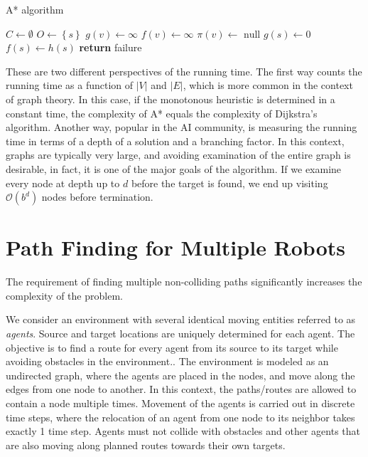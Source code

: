\begin{algorithm}
\DontPrintSemicolon
\SetAlgoLined
{}
\caption{A* algorithm}
\BlankLine
{}
\BlankLine
	$C\leftarrow\emptyset$ 
	$O\leftarrow\left\{s\right\}$  
 {
	$g(v)\leftarrow\infty$\;
	$f(v)\leftarrow\infty$\;
	$\pi(v)\leftarrow \text{ null}$ 
}
$g(s)\leftarrow 0$\;
$f(s)\leftarrow h(s)$\;
\textbf{return } failure
\label{alg:astar}
\end{algorithm}

These are two different perspectives of the running time. 
The first way counts the running time as a function of $|V|$ and $|E|$, which is more common in the context of graph theory.
In this case, if the monotonous heuristic is determined in a constant time, the complexity of A* equals the complexity of Dijkstra's algorithm. 
Another way, popular in the AI community, is measuring the running time in terms of a depth of a solution and a branching factor.
In this context, graphs are typically very large, and avoiding examination of the entire graph is desirable, in fact, it is one of the major goals of the algorithm.
If we examine every node at depth up to $d$ before the target is found, we end up visiting $\mathcal{O}(b^d)$ nodes before termination.
\section{Path Finding for Multiple Robots}

The requirement of finding multiple non-colliding paths significantly increases the complexity of the problem.

We consider an environment with several identical moving entities referred to as \emph{agents}. 
Source and target locations are uniquely determined for each agent. 
The objective is to find a route for every agent from its source to its target while avoiding obstacles in the environment..
The environment is modeled as an undirected graph, where the agents are placed in the nodes, and move along the edges from one node to another. 
In this context, the paths/routes are allowed to contain a node multiple times.
Movement of the agents is carried out in discrete time steps, where the relocation of an agent from one node to its neighbor takes exactly 1 time step.
Agents must not collide with obstacles and other agents that are also moving along planned routes towards their own targets.

